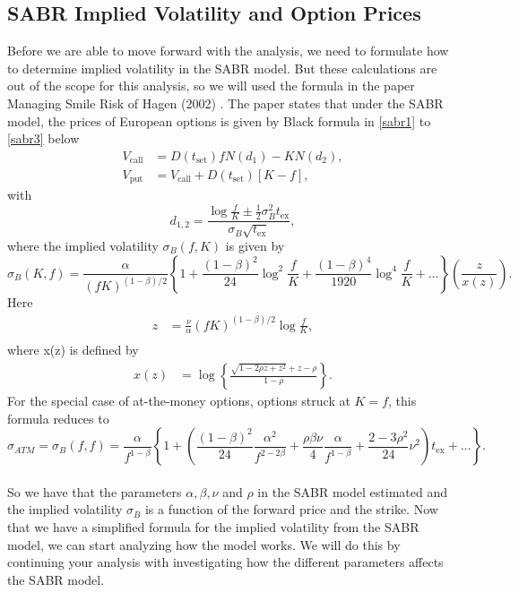 \subsection{SABR Implied Volatility and Option Prices}
Before we are able to move forward with the analysis,
we need to formulate how to determine implied volatility in the SABR model. 
But these calculations are out of the scope for this analysis,
so we will used the formula in the paper Managing Smile Risk 
of Hagen (2002) \cite{Smile}. The paper states that
under the SABR model, the prices of European options 
is given by Black formula in \autoref{sabr1} to \autoref{sabr3}
below
\begin{align}
    V_{\text{call}} &= D(t_{\text{set}})fN(d_1) - KN(d_2),  \label{sabr1}\\
    V_{\text{put}} &= V_{\text{call}} + D(t_{\text{set}})[K - f], \label{sabr2}
\end{align}
with
\begin{equation}
    d_{1,2} = \frac{\log \frac{f}{K} \pm \frac{1}{2}\sigma_B^2 t_{\text{ex}}}{\sigma_B \sqrt{t_{\text{ex}}}}, \label{sabr3}
\end{equation}
where the implied volatility $\sigma_B(f, K)$ is given by
\begin{equation}
    \sigma_B(K, f) = \frac{\alpha}{(fK)^{(1-\beta)/2}} \left\{ 1 + \frac{(1-\beta)^2}{24} \log^2 \frac{f}{K} + \frac{(1-\beta)^4}{1920} \log^4 \frac{f}{K} + \ldots \right\} \left( \frac{z}{x(z)} \right).
    \label{sigma_B}
\end{equation}
Here
\begin{align}
    z &= \frac{\nu}{\alpha}(fK)^{(1-\beta)/2} \log \frac{f}{K}, \\
\end{align}
where x(z) is defined by
\begin{align}
    x(z) &= \log \left\{ \frac{\sqrt{1-2\rho z + z^2} + z - \rho}{1 - \rho} \right\}.
\end{align}
For the special case of at-the-money options, options struck at $K = f$, this formula reduces to
\begin{equation}
    \sigma_{ATM} = \sigma_B(f, f) = \frac{\alpha}{f^{1-\beta}} \left\{ 1 + \left( \frac{(1-\beta)^2}{24} \frac{\alpha^2}{f^{2-2\beta}} + \frac{\rho \beta \nu}{4} \frac{\alpha}{f^{1-\beta}} + \frac{2-3\rho^2}{24} \nu^2 \right) t_{\text{ex}} + \ldots \right\}.
    \label{sigma_ff}
\end{equation}
\\
So we have that the parameters $\alpha, \beta, \nu$ and $\rho$  in the SABR model estimated and the implied volatility $\sigma_B$
is a function of the forward price and the strike. Now that we have a simplified formula for the implied 
volatility from the SABR model, we can start analyzing 
how the model works. We will do this by continuing your
analysis with investigating how the different parameters 
affects the SABR model. 

